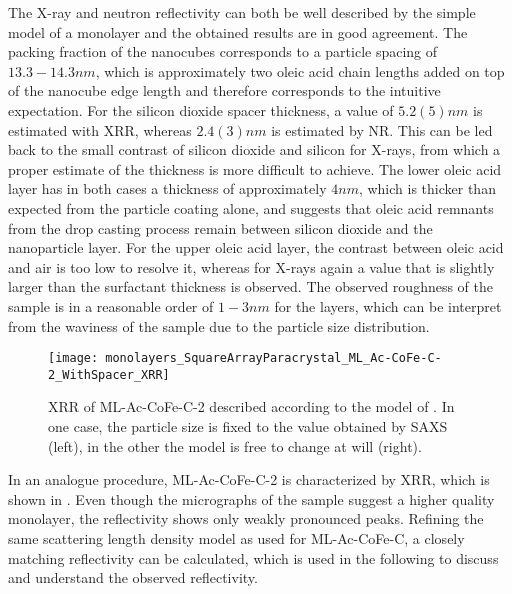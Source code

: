 \documentclass[\main/dresen_thesis.tex]{subfiles}
\begin{document}
  The X-ray and neutron reflectivity can both be well described by the simple model of a monolayer and the obtained results are in good agreement.
  The packing fraction of the nanocubes corresponds to a particle spacing of $13.3 - 14.3 \unit{nm}$, which is approximately two oleic acid chain lengths added on top of the nanocube edge length and therefore corresponds to the intuitive expectation.
  For the silicon dioxide spacer thickness, a value of $5.2(5) \unit{nm}$ is estimated with  XRR, whereas $2.4(3) \unit{nm}$ is estimated by NR.
  This can be led back to the small contrast of silicon dioxide and silicon for X-rays, from which a proper estimate of the thickness is more difficult to achieve.
  The lower oleic acid layer has in both cases a thickness of approximately $4 \unit{nm}$, which is thicker than expected from the particle coating alone, and suggests that oleic acid remnants from the drop casting process remain between silicon dioxide and the nanoparticle layer.
  For the upper oleic acid layer, the contrast between oleic acid and air is too low to resolve it, whereas for X-rays again a value that is slightly larger than the surfactant thickness is observed.
  The observed roughness of the sample is in a reasonable order of $1 - 3 \unit{nm}$ for the layers, which can be interpret from the waviness of the sample \eg due to the particle size distribution.

  \begin{figure}[tb]
    \centering
    \texttt{[image: monolayers\_SquareArrayParacrystal\_ML\_Ac-CoFe-C-2\_WithSpacer\_XRR]}
    \caption{\label{fig:monolayers:structure:squareArrayParacrystal:XRR}XRR of ML-Ac-CoFe-C-2 described according to the model of . In one case, the particle size is fixed to the value obtained by SAXS (left), in the other the model is free to change at will (right).}
  \end{figure}

  In an analogue procedure, ML-Ac-CoFe-C-2 is characterized by XRR, which is shown in .
  Even though the micrographs of the sample suggest a higher quality monolayer, the reflectivity shows only weakly pronounced peaks.
  Refining the same scattering length density model as used for ML-Ac-CoFe-C, a closely matching reflectivity can be calculated, which is used in the following to discuss and understand the observed reflectivity.
\end{document}
